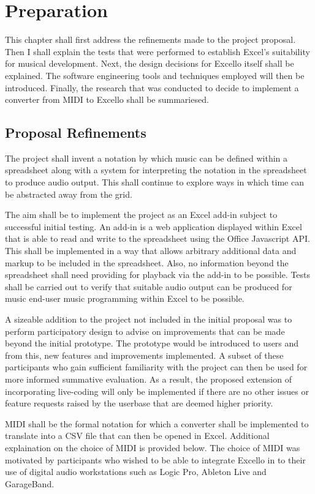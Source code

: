 \documentclass{article}
\begin{document}
\chapter{Preparation}

This chapter shall first address the refinements made to the project proposal. Then I shall explain the tests that were performed to establish Excel's suitability for musical development. Next, the design decisions for Excello itself shall be explained. The software engineering tools and techniques employed will then be introduced. Finally, the research that was conducted to decide to implement a converter from MIDI to Excello shall be summariesed.

\section{Proposal Refinements}

The project shall invent a notation by which music can be defined within a spreadsheet along with a system for interpreting the notation in the spreadsheet to produce audio output. This shall continue to explore ways in which time can be abstracted away from the grid.

The aim shall be to implement the project as an Excel add-in subject to successful initial testing. An add-in is a web application displayed within Excel that is able to read and write to the spreadsheet using the Office Javascript API. This shall be implemented in a way that allows arbitrary additional data and markup to be included in the spreadsheet. Also, no information beyond the spreadsheet shall need providing for playback via the add-in to be possible. Tests shall be carried out to verify that suitable audio output can be produced for music end-user music programming within Excel to be possible.

A sizeable addition to the project not included in the initial proposal was to perform participatory design \cite{muller:pd} to advise on improvements that can be made beyond the initial prototype. The prototype would be introduced to users and from this, new features and improvements implemented. A subset of these participants who gain sufficient familiarity with the project can then be used for more informed summative evaluation. As a result, the proposed extension of incorporating live-coding will only be implemented if there are no other issues or feature requests raised by the userbase that are deemed higher priority.

MIDI shall be the formal notation for which a converter shall be implemented to translate into a CSV file that can then be opened in Excel. Additional explaination on the choice of MIDI is provided below. The choice of MIDI was motivated by participants who wished to be able to integrate Excello in to their use of digital audio workstations such as Logic Pro, Ableton Live and GarageBand.
\end{document}
